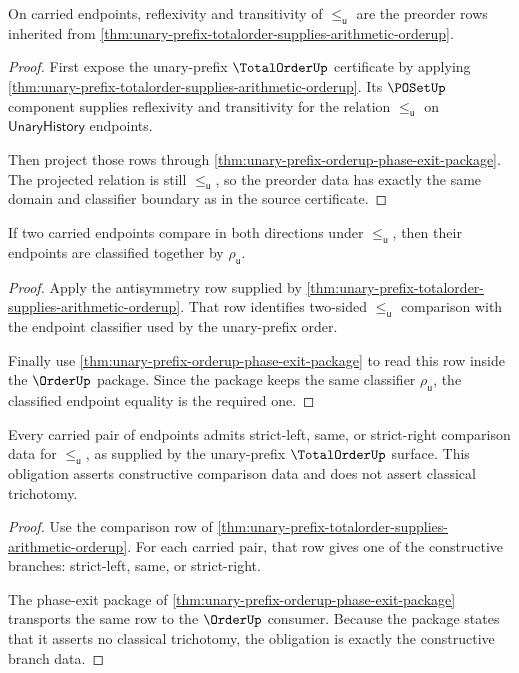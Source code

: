 \begin{theorem}
\label{thm:unary-prefix-orderup-preorder-obligation}
On carried endpoints, reflexivity and transitivity of $\le_{\mathsf{u}}$ are
the preorder rows inherited from
\autoref{thm:unary-prefix-totalorder-supplies-arithmetic-orderup}.
\end{theorem}
\begin{proof}
First expose the unary-prefix $\TotalOrderUp$ certificate by applying
\autoref{thm:unary-prefix-totalorder-supplies-arithmetic-orderup}. Its
$\POSetUp$ component supplies reflexivity and transitivity for the relation
$\le_{\mathsf{u}}$ on $\mathsf{UnaryHistory}$ endpoints.

Then project those rows through
\autoref{thm:unary-prefix-orderup-phase-exit-package}. The projected relation
is still $\le_{\mathsf{u}}$, so the preorder data has exactly the same domain
and classifier boundary as in the source certificate.
\end{proof}

\begin{theorem}
\label{thm:unary-prefix-orderup-antisymmetry-obligation}
If two carried endpoints compare in both directions under $\le_{\mathsf{u}}$,
then their endpoints are classified together by $\rho_{\mathsf{u}}$.
\end{theorem}
\begin{proof}
Apply the antisymmetry row supplied by
\autoref{thm:unary-prefix-totalorder-supplies-arithmetic-orderup}. That row
identifies two-sided $\le_{\mathsf{u}}$ comparison with the endpoint classifier
used by the unary-prefix order.

Finally use \autoref{thm:unary-prefix-orderup-phase-exit-package} to read this
row inside the $\OrderUp$ package. Since the package keeps the same classifier
$\rho_{\mathsf{u}}$, the classified endpoint equality is the required one.
\end{proof}

\begin{theorem}
\label{thm:unary-prefix-orderup-constructive-comparison-obligation}
Every carried pair of endpoints admits strict-left, same, or strict-right
comparison data for $\le_{\mathsf{u}}$, as supplied by the unary-prefix
$\TotalOrderUp$ surface. This obligation asserts constructive comparison data
and does not assert classical trichotomy.
\end{theorem}
\begin{proof}
Use the comparison row of
\autoref{thm:unary-prefix-totalorder-supplies-arithmetic-orderup}. For each
carried pair, that row gives one of the constructive branches: strict-left,
same, or strict-right.

The phase-exit package of
\autoref{thm:unary-prefix-orderup-phase-exit-package} transports the same row to
the $\OrderUp$ consumer. Because the package states that it asserts no
classical trichotomy, the obligation is exactly the constructive branch data.
\end{proof}

